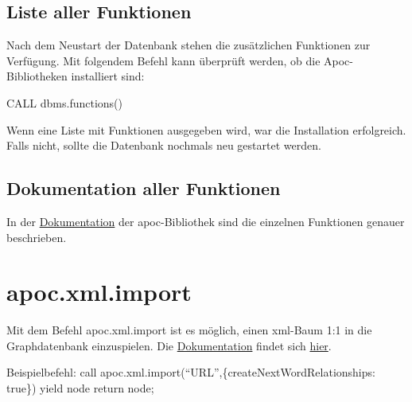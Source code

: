 \documentclass[ngerman,]{scrreprt}
\begin{document}
\subsection{Liste aller Funktionen}\label{liste-aller-funktionen}

Nach dem Neustart der Datenbank stehen die zusätzlichen Funktionen zur Verfügung. Mit folgendem Befehl kann überprüft werden, ob die Apoc-Bibliotheken installiert sind:

CALL dbms.functions()

Wenn eine Liste mit Funktionen ausgegeben wird, war die Installation erfolgreich. Falls nicht, sollte die Datenbank nochmals neu gestartet werden.

\subsection{Dokumentation aller Funktionen}\label{dokumentation-aller-funktionen}

In der \href{https://neo4j-contrib.github.io/neo4j-apoc-procedures/}{Dokumentation} der apoc-Bibliothek sind die einzelnen Funktionen genauer beschrieben.

\section{apoc.xml.import}\label{apoc.xml.import}

Mit dem Befehl apoc.xml.import ist es möglich, einen xml-Baum 1:1 in die Graphdatenbank einzuspielen. Die \href{https://neo4j-contrib.github.io/neo4j-apoc-procedures/\#_import_xml_directly}{Dokumentation} findet sich \href{https://neo4j-contrib.github.io/neo4j-apoc-procedures/\#_import_xml_directly}{hier}.

Beispielbefehl: call apoc.xml.import(``URL'',\{createNextWordRelationships: true\}) yield node return node;
\end{document}
